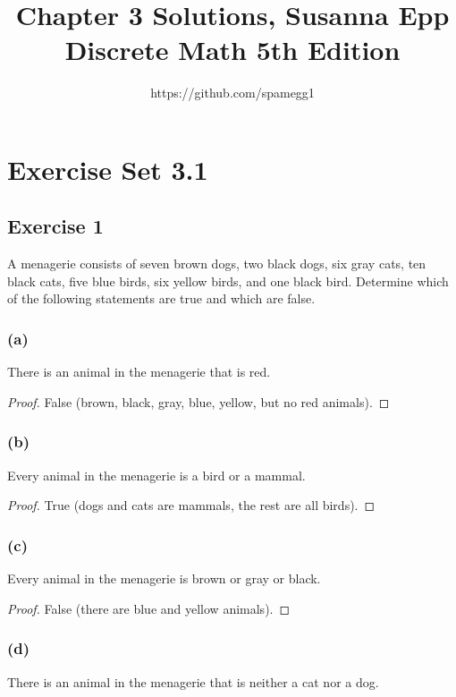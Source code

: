\documentclass[14pt]{extarticle}
\title{Chapter 3 Solutions, Susanna Epp Discrete Math 5th Edition}
\author{https://github.com/spamegg1}
\begin{document}
\maketitle
\tableofcontents

\section{Exercise Set 3.1}

\subsection{Exercise 1}
A menagerie consists of seven brown dogs, two black dogs, six gray cats, ten black cats, five blue birds, six yellow birds, and one black bird. Determine which of the following statements are true and which are false.

\subsubsection{(a)}
There is an animal in the menagerie that is red.

\begin{proof}
False (brown, black, gray, blue, yellow, but no red animals).
\end{proof}

\subsubsection{(b)}
Every animal in the menagerie is a bird or a mammal.

\begin{proof}
True (dogs and cats are mammals, the rest are all birds).
\end{proof}

\subsubsection{(c)}
Every animal in the menagerie is brown or gray or black.

\begin{proof}
False (there are blue and yellow animals).
\end{proof}

\subsubsection{(d)}
There is an animal in the menagerie that is neither a cat nor a dog.
\end{document}
